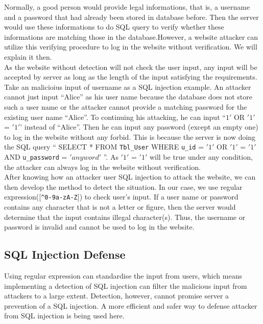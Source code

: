 \documentclass[12pt]{article}
\begin{document}
Normally, a good person would provide legal informations, that is, a username  and a password that had already been stored in database before. Then the server would use these informations to do SQL query to verify whether these informations are matching those in the database.However, a website attacker can utilize this verifying procedure to log in the website without verification. We will explain it then.\\

As the website without detection will not check the user input, any input will be accepted by server as long as the length of the input satisfying the requirements. Take an malicioius input of username as a SQL injection example. An attacker cannot just input ``Alice'' as his user name because the database does not store such a user name or the attacker cannot provide a matching password for the existing user name ``Alice''. To continuing his attacking, he can input ``\(1'\) OR \('1'\) = \('1'\)' instead of ``Alice''. Then he can input any password (except an empty one) to log in the website without any forbid. This is because the server is now doing the SQL query `` SELECT * FROM \verb"Tbl_User" WHERE \verb"u_id" = \('1'\) OR \('1'\) = \('1'\) AND \verb"u_password" = \('anyword'\) ''. As \('1'\) = \('1'\) will be true under any condition, the attacker can always log in the website without verification.\\

After knowing how an attacker user SQL injection to attack the website, we can then develop the method to detect the situation. In our case, we use regular expression([\verb"^0-9a-zA-Z"]) to check user's input. If a user name or password contains any character that is not a letter or figure, then the server would determine that the input contains illegal character(s). Thus, the username or password is invalid and cannot be used to log in the website.\\

\subsection{SQL Injection Defense}
Using regular expression can standardise the input from users, which means implementing a detection of SQL injection can filter the malicious input from attackers to a large extent. Detection, however, cannot promise server a prevention of a SQL injection. A more efficient and safer way to defense attacker from SQL injection is being used here.\\
\end{document}
